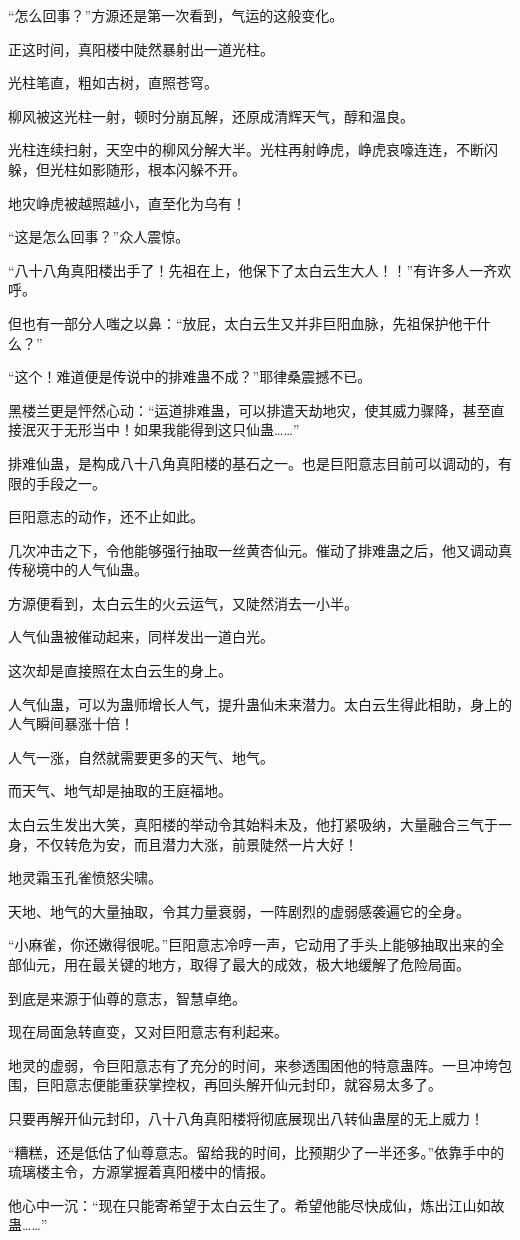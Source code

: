 \begin{this_body}
“怎么回事？”方源还是第一次看到，气运的这般变化。

正这时间，真阳楼中陡然暴射出一道光柱。

光柱笔直，粗如古树，直照苍穹。

柳风被这光柱一射，顿时分崩瓦解，还原成清辉天气，醇和温良。

光柱连续扫射，天空中的柳风分解大半。光柱再射峥虎，峥虎哀嚎连连，不断闪躲，但光柱如影随形，根本闪躲不开。

地灾峥虎被越照越小，直至化为乌有！

“这是怎么回事？”众人震惊。

“八十八角真阳楼出手了！先祖在上，他保下了太白云生大人！！”有许多人一齐欢呼。

但也有一部分人嗤之以鼻：“放屁，太白云生又并非巨阳血脉，先祖保护他干什么？”

“这个！难道便是传说中的排难蛊不成？”耶律桑震撼不已。

黑楼兰更是怦然心动：“运道排难蛊，可以排遣天劫地灾，使其威力骤降，甚至直接泯灭于无形当中！如果我能得到这只仙蛊……”

排难仙蛊，是构成八十八角真阳楼的基石之一。也是巨阳意志目前可以调动的，有限的手段之一。

巨阳意志的动作，还不止如此。

几次冲击之下，令他能够强行抽取一丝黄杏仙元。催动了排难蛊之后，他又调动真传秘境中的人气仙蛊。

方源便看到，太白云生的火云运气，又陡然消去一小半。

人气仙蛊被催动起来，同样发出一道白光。

这次却是直接照在太白云生的身上。

人气仙蛊，可以为蛊师增长人气，提升蛊仙未来潜力。太白云生得此相助，身上的人气瞬间暴涨十倍！

人气一涨，自然就需要更多的天气、地气。

而天气、地气却是抽取的王庭福地。

太白云生发出大笑，真阳楼的举动令其始料未及，他打紧吸纳，大量融合三气于一身，不仅转危为安，而且潜力大涨，前景陡然一片大好！

地灵霜玉孔雀愤怒尖啸。

天地、地气的大量抽取，令其力量衰弱，一阵剧烈的虚弱感袭遍它的全身。

“小麻雀，你还嫩得很呢。”巨阳意志冷哼一声，它动用了手头上能够抽取出来的全部仙元，用在最关键的地方，取得了最大的成效，极大地缓解了危险局面。

到底是来源于仙尊的意志，智慧卓绝。

现在局面急转直变，又对巨阳意志有利起来。

地灵的虚弱，令巨阳意志有了充分的时间，来参透围困他的特意蛊阵。一旦冲垮包围，巨阳意志便能重获掌控权，再回头解开仙元封印，就容易太多了。

只要再解开仙元封印，八十八角真阳楼将彻底展现出八转仙蛊屋的无上威力！

“糟糕，还是低估了仙尊意志。留给我的时间，比预期少了一半还多。”依靠手中的琉璃楼主令，方源掌握着真阳楼中的情报。

他心中一沉：“现在只能寄希望于太白云生了。希望他能尽快成仙，炼出江山如故蛊……”

\end{this_body}

